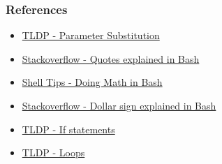 \documentclass{beamer}
\newcommand{\code}[1]{\colorbox{codegray}{\texttt{#1}}}
\begin{document}
\begin{frame}
\frametitle{References}
\begin{itemize}
    \item \href{https://tldp.org/LDP/abs/html/parameter-substitution.html}{TLDP - Parameter Substitution}
    \bigskip
    \item \href{https://stackoverflow.com/questions/6697753/difference-between-single-and-double-quotes-in-bash}{Stackoverflow - Quotes explained in Bash }
    \bigskip
    \item \href{https://www.shell-tips.com/bash/math-arithmetic-calculation/}{Shell Tips - Doing Math in Bash}
    \bigskip
    \item \href{https://stackoverflow.com/a/5163260/4021436}{Stackoverflow - Dollar sign explained in Bash }
    \bigskip
    \item \href{https://tldp.org/LDP/Bash-Beginners-Guide/html/sect_07_01.html}{TLDP - If statements}
    \bigskip
    \item \href{https://tldp.org/LDP/abs/html/loops1.html}{TLDP - Loops }
\end{itemize}
\end{frame}





\end{document}
